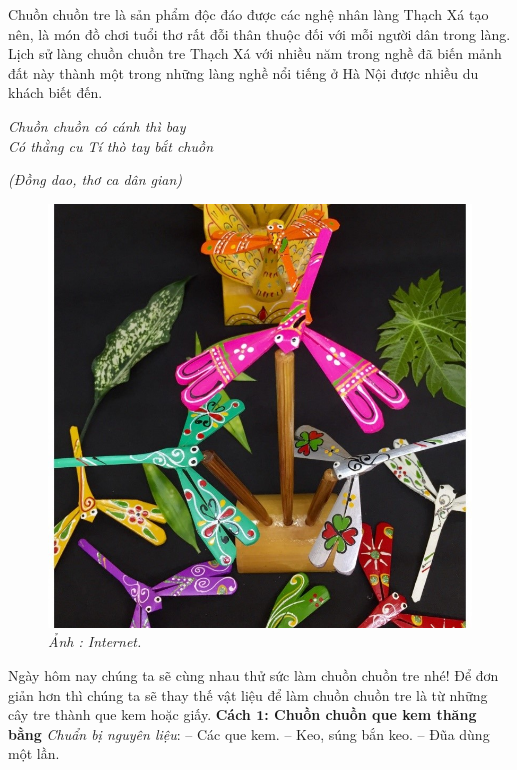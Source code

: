 \begin{multicols}{2}
	Chuồn chuồn tre là sản phẩm độc đáo được các nghệ nhân làng Thạch Xá tạo nên, là món đồ chơi tuổi thơ rất đỗi thân thuộc đối với mỗi người dân trong làng. Lịch sử làng chuồn chuồn tre Thạch Xá với nhiều năm trong nghề đã biến mảnh đất này thành một trong những làng nghề nổi tiếng ở Hà Nội được nhiều du khách biết đến.
	\vskip 0.1cm 
	\begin{center}
		\textit{Chuồn chuồn có cánh thì bay\\
	Có thằng cu Tí thò tay bắt chuồn}
	\end{center}
	\hfill \textit{(Đồng dao, thơ ca dân gian)}
	\begin{figure}[H]
		\vspace*{-5pt}
		\centering
		\captionsetup{labelformat= empty, justification=centering}
		\includegraphics[width= 0.9\linewidth]{10}
		\caption{\small\textit{\color{toancuabi}Ảnh : Internet.}}
		\vspace*{-10pt}
	\end{figure}
	Ngày hôm nay chúng ta sẽ cùng nhau thử sức làm chuồn chuồn tre nhé! Để đơn giản hơn thì chúng ta sẽ thay thế vật liệu để làm chuồn chuồn tre là từ những cây tre thành que kem hoặc giấy.
	\vskip 0.1cm
	\textbf{\color{toancuabi}Cách $\pmb{1}$: Chuồn chuồn que kem thăng bằng}
	\vskip 0.1cm
	\textit{Chuẩn bị nguyên liệu}: 
	\vskip 0.05cm
	-- Các que kem.
	\vskip 0.05cm
	-- Keo, súng bắn keo.
	\vskip 0.05cm
	-- Đũa dùng một lần.

\end{multicols}
